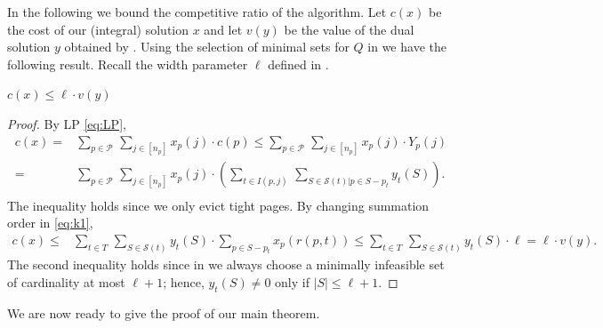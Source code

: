 \documentclass[11pt]{article}
\newcommand{\cP}{{\mathcal{P}}}
\newcommand{\cS}{{\mathcal{S}}}
\begin{document}
In the following we bound the competitive ratio of the algorithm. %
Let $c(x)$ be the cost of our (integral) solution $x$ and let $v(y)$ be the value of the dual solution $y$ obtained by . Using the selection of minimal sets for $Q$ in  we have the following result. 
Recall the width parameter $\ell$ defined in . 


	\begin{lemma}
	\label{lem:k}
$c(x) \leq \ell \cdot v(y)$
\end{lemma}

\begin{proof}
By LP \eqref{eq:LP},
\begin{equation}
	\label{eq:k1}
	\begin{aligned}
 c(x) ={} & \sum_{p \in \cP~} \sum_{j \in [n_p]}  x_p(j) \cdot c(p)
	\leq{}   \sum_{p \in \cP~} \sum_{j \in [n_p]} x_p(j) \cdot Y_p(j) \\
	={} &   \sum_{p \in \cP~} \sum_{j \in [n_p]} x_p(j) \cdot \left(  \sum_{t \in I(p,j)~} \sum_{S \in \cS(t)\big|p \in S-p_t} y_t(S) \right).\\
	\end{aligned}
\end{equation} The inequality holds since we only evict tight pages. By changing summation order in \eqref{eq:k1}, 
\begin{equation*}
	\label{eq:k2}
	\begin{aligned}
		c(x) \leq{} & \sum_{t \in T~} \sum_{S  \in \cS(t)} y_t(S) \cdot \sum_{p \in S -p_t} x_p(r(p,t)) \leq \sum_{t \in T~} \sum_{S  \in \cS(t)} y_t(S) \cdot \ell = \ell \cdot v(y). 
	\end{aligned}
\end{equation*} The second inequality holds since in  we always choose a minimally infeasible set of cardinality at most $\ell +1$; hence, $y_t(S) \neq 0$ only if $|S| \leq \ell+1$. 
\end{proof}
\noindent{}
We are now ready to give the proof of our main theorem. 
\end{document}
